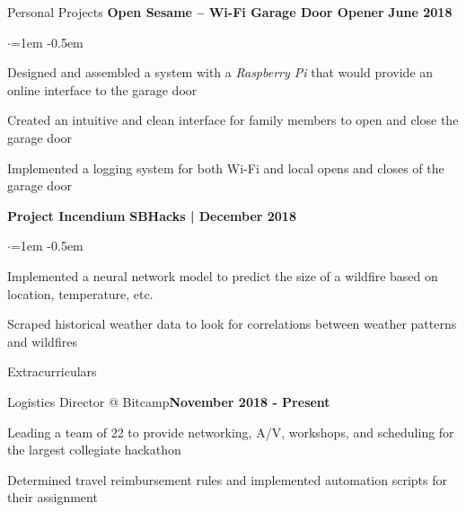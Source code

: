 \documentclass[margin,centered]{resume} %
\begin{document}
\begin{rSection}{Personal Projects}
{\bf Open Sesame – Wi-Fi Garage Door Opener}  \hfill {\bf June 2018}
 \begin{list}{$\cdot$}{\leftmargin=1em} %
   \itemsep -0.5em \vspace{-0.5em} %
	\item 
		Designed and assembled a system with a \textit{Raspberry Pi} that would provide an online interface to the garage door
	\item
		Created an intuitive and clean interface for family members to open and close the garage door
	\item
		Implemented a logging system for both Wi-Fi and local opens and closes of the garage door
  \end{list}

{\bf Project Incendium}  \hfill {\bf SBHacks | December 2018}
\begin{list}{$\cdot$}{\leftmargin=1em} %
\itemsep -0.5em \vspace{-0.5em} %
	\item 
		Implemented a neural network model to predict the size of a wildfire based on location, temperature, etc.
	\item
		Scraped historical weather data to look for correlations between weather patterns and wildfires
\end{list}

\end{rSection}



\begin{rSection}{Extracurriculars} 

	\begin{rSubsection}{Logistics Director @ Bitcamp}{\textbf{November 2018 - Present}}{}{}
		\item Leading a team of 22 to provide networking, A/V, workshops, and scheduling for the largest collegiate hackathon
		\item Determined travel reimbursement rules and implemented automation scripts for their assignment
	\end{rSubsection}

\end{rSection}
\end{document}
